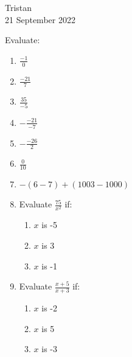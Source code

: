 \documentclass[14pt]{extarticle} %
\begin{document}
\hfill Tristan\\
\null\hfill 21 September 2022

\vspace{10mm}

Evaluate:
\begin{enumerate}[label=\Alph*.), itemsep=\fill]
\item  $\frac{-1}{0}$
\item  $\frac{-21}{7}$
\item  $\frac{35}{-5}$
\item  $-\frac{-21}{-7}$
\item  $-\frac{-26}{2}$
\item  $\frac{0}{10}$
\vfill\clearpage
\item  $-(6-7)+(1003-1000)$
\item Evaluate $\frac{75}{x^2}$ if:
    \begin{enumerate}[itemsep=\fill]
    \item $x$ is -5
    \item $x$ is 3
    \item $x$ is -1
    \vfill\end{enumerate}
\item Evaluate $\frac{x+5}{x+3}$ if:
    \begin{enumerate}[itemsep=\fill]
    \item $x$ is -2
    \item $x$ is 5
    \item $x$ is -3
    \end{enumerate}
\vfill\end{enumerate}
\end{document}

